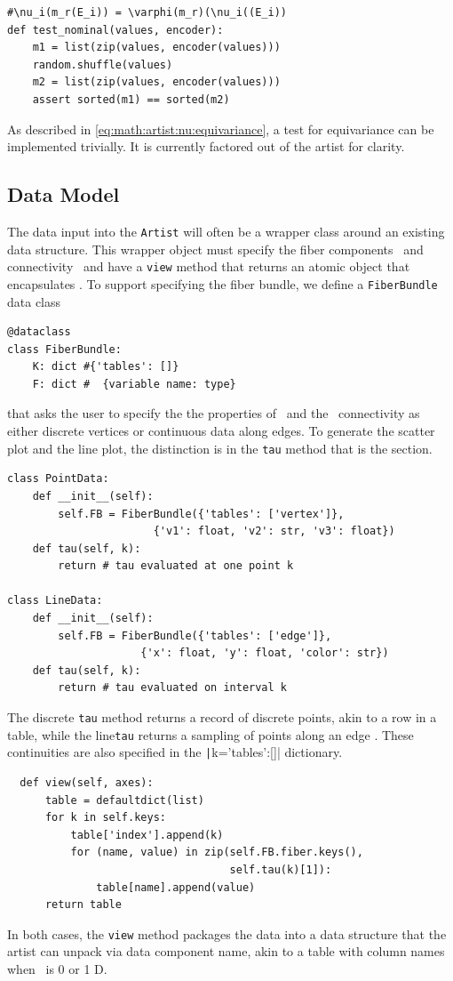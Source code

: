 \documentclass[../main.tex]{subfiles}
\begin{document}
\begin{verbatim}
#\nu_i(m_r(E_i)) = \varphi(m_r)(\nu_i((E_i))
def test_nominal(values, encoder):
    m1 = list(zip(values, encoder(values)))
    random.shuffle(values)
    m2 = list(zip(values, encoder(values)))
    assert sorted(m1) == sorted(m2)
\end{verbatim}
As described in \autoref{eq:math:artist:nu:equivariance}, a test for equivariance can be implemented trivially. It is currently factored out of the artist for clarity. 

\subsection{Data Model}
\label{sec:code:data}
The data input into the \texttt{Artist} will often be a wrapper class around an existing data structure. This wrapper object must specify the fiber components \dfiber\ and connectivity \dbase\ and have a \texttt{view} method that returns an atomic object that encapsulates \dsection. To support specifying the fiber bundle, we define a \texttt{FiberBundle} data class\cite{DataClasses}

\begin{verbatim}
@dataclass
class FiberBundle:
    K: dict #{'tables': []}
    F: dict #  {variable name: type}
\end{verbatim}
that asks the user to specify the the properties of \dfiber\ and the \dbase\ connectivity as either discrete vertices or continuous data along edges. To generate the scatter plot and the line plot, the distinction is in the \texttt{tau} method that is the section. 
\begin{verbatim}
class PointData:     
    def __init__(self):
        self.FB = FiberBundle({'tables': ['vertex']},  
                       {'v1': float, 'v2': str, 'v3': float})
    def tau(self, k):
        return # tau evaluated at one point k

class LineData:
    def __init__(self):
        self.FB = FiberBundle({'tables': ['edge']},  
                     {'x': float, 'y': float, 'color': str})
    def tau(self, k):
        return # tau evaluated on interval k
\end{verbatim}
The discrete \texttt{tau} method returns a record of discrete points, akin to a row in a table, while the line\texttt{tau} returns a sampling of points along an edge \dbasepoint. These continuities are also specified in the \texttt|k={'tables':[]}| dictionary. 
\begin{verbatim}
  def view(self, axes):
      table = defaultdict(list)
      for k in self.keys:
          table['index'].append(k)
          for (name, value) in zip(self.FB.fiber.keys(), 
                                   self.tau(k)[1]):
              table[name].append(value)
      return table
\end{verbatim}
In both cases, the \texttt{view} method packages the data into a data structure that the artist can unpack via data component name, akin to a table with column names when \dbase\ is 0 or 1 D. 
\end{document}
